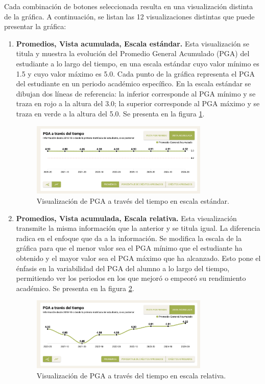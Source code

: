 Cada combinación de botones seleccionada resulta en una visualización distinta de la gráfica. A continuación, se listan las 12 visualizaciones distintas que puede presentar la gráfica:
\begin{enumerate}
  \item \textbf{Promedios, Vista acumulada, Escala estándar.} Esta visualización se titula  y muestra la evolución del Promedio General Acumulado (PGA) del estudiante a lo largo del tiempo, en una escala estándar cuyo valor mínimo es 1.5 y cuyo valor máximo es 5.0. Cada punto de la gráfica representa el PGA del estudiante en un periodo académico específico. En la escala estándar se dibujan dos líneas de referencia: la inferior corresponde al PGA mínimo y se traza en rojo a la altura del 3.0; la superior corresponde al PGA máximo y se traza en verde a la altura del 5.0. Se presenta en la figura \ref{fig:pga_estandar}.
  
  \begin{figure}[H]
    \centering
    \includegraphics[width=0.8\textwidth]{img/nes/pga_estandar.png}
    \caption{Visualización de PGA a través del tiempo en escala estándar.}
    \label{fig:pga_estandar}
  \end{figure}

  \item \textbf{Promedios, Vista acumulada, Escala relativa.} Esta visualización transmite la misma información que la anterior y se titula igual. La diferencia radica en el enfoque que da a la información. Se modifica la escala de la gráfica para que el menor valor sea el PGA mínimo que el estudiante ha obtenido y el mayor valor sea el PGA máximo que ha alcanzado. Esto pone el énfasis en la variabilidad del PGA del alumno a lo largo del tiempo, permitiendo ver los periodos en los que mejoró o empeoró su rendimiento académico. Se presenta en la figura \ref{fig:pga_relativo}.
  
  \begin{figure}[H]
    \centering
    \includegraphics[width=0.8\textwidth]{img/nes/pga_relativo.png}
    \caption{Visualización de PGA a través del tiempo en escala relativa.}
    \label{fig:pga_relativo}
  \end{figure}


\end{enumerate}
